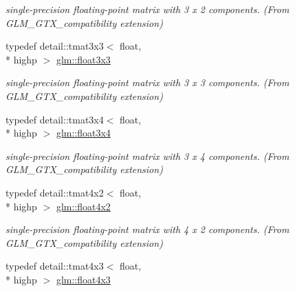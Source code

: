 \begin{DoxyCompactItemize}
\begin{DoxyCompactList}\small\item\em single-\/precision floating-\/point matrix with 3 x 2 components. (From G\-L\-M\-\_\-\-G\-T\-X\-\_\-compatibility extension) \end{DoxyCompactList}\item 
\hypertarget{group__gtx__compatibility_ga11458ecd63c32b7e502d90091a6d0a6c}{typedef detail\-::tmat3x3$<$ float, \\*
highp $>$ \hyperlink{group__gtx__compatibility_ga11458ecd63c32b7e502d90091a6d0a6c}{glm\-::float3x3}}\label{group__gtx__compatibility_ga11458ecd63c32b7e502d90091a6d0a6c}

\begin{DoxyCompactList}\small\item\em single-\/precision floating-\/point matrix with 3 x 3 components. (From G\-L\-M\-\_\-\-G\-T\-X\-\_\-compatibility extension) \end{DoxyCompactList}\item 
\hypertarget{group__gtx__compatibility_ga53eb75b08b92aa34886397150c983943}{typedef detail\-::tmat3x4$<$ float, \\*
highp $>$ \hyperlink{group__gtx__compatibility_ga53eb75b08b92aa34886397150c983943}{glm\-::float3x4}}\label{group__gtx__compatibility_ga53eb75b08b92aa34886397150c983943}

\begin{DoxyCompactList}\small\item\em single-\/precision floating-\/point matrix with 3 x 4 components. (From G\-L\-M\-\_\-\-G\-T\-X\-\_\-compatibility extension) \end{DoxyCompactList}\item 
\hypertarget{group__gtx__compatibility_gab805aa2d6bbd5edddf78bd2e9322e6c7}{typedef detail\-::tmat4x2$<$ float, \\*
highp $>$ \hyperlink{group__gtx__compatibility_gab805aa2d6bbd5edddf78bd2e9322e6c7}{glm\-::float4x2}}\label{group__gtx__compatibility_gab805aa2d6bbd5edddf78bd2e9322e6c7}

\begin{DoxyCompactList}\small\item\em single-\/precision floating-\/point matrix with 4 x 2 components. (From G\-L\-M\-\_\-\-G\-T\-X\-\_\-compatibility extension) \end{DoxyCompactList}\item 
\hypertarget{group__gtx__compatibility_ga72398a5d715031923beca8907c52f5d6}{typedef detail\-::tmat4x3$<$ float, \\*
highp $>$ \hyperlink{group__gtx__compatibility_ga72398a5d715031923beca8907c52f5d6}{glm\-::float4x3}}\label{group__gtx__compatibility_ga72398a5d715031923beca8907c52f5d6}


\end{DoxyCompactItemize}

